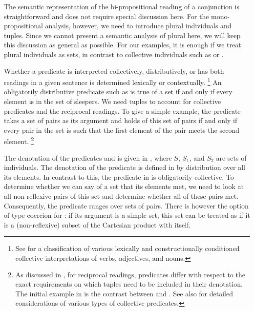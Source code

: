 \documentclass[output=paper]{langsci/langscibook}
\begin{document}
The semantic representation of the bi-propositional reading of a conjunction is straightforward and does not require special discussion here. 
For the mono-propositional analysis, however, we need to introduce plural individuals and tuples.
%
Since we cannot present a semantic analysis of plural here, we will keep this discussion as general as possible. 
For our examples, it is enough if we treat plural individuals as sets, in contrast to collective individuals such as  or  \citep{Link:83}. 

Whether a predicate is interpreted collectively, distributively, or has both readings in a given sentence is determined lexically or contextually.%
\footnote{See \citet[46]{Winter:01} for a classification of various lexically and constructionally conditioned collective interpretations of verbs, adjectives, and nouns.}
%
An  obligatorily distributive predicate such as  is true of a set if 
and only if every element is in the set of sleepers.
We need tuples to account for collective predicates and the reciprocal readings. 
To give a simple example, the predicate  takes a set of pairs as its argument and holds of this set of pairs if and only if every pair in the set is such that the first element of the pair meets the second element.%
\footnote{As discussed in \citet{Sabato:Winter:12}, for reciprocal readings, predicates differ with respect to the exact requirements on which tuples need to be included in their denotation. 
The initial example in \citet{Sabato:Winter:12} is the contrast between  and .
See also \citet{Winter:16} for detailed considerations of various types of collective predicates.}

The denotation of the predicates  and  is given
in , where $S$, $S_1$, and $S_2$ are sets of individuals.
The denotation of the predicate  is defined in  by distribution over all its elements.
In contrast to this, the predicate  in  is obligatorily collective.
To determine whether we can say of a set that its elements met, we need to look at all non-reflexive pairs of this set and determine whether all of these pairs met.
Consequently, the predicate  ranges over sets of pairs. There is however the option of type coercion for : if its argument is a simple set, this set can be treated as if it is a (non-reflexive) subset of the Cartesian product with itself.
\end{document}
